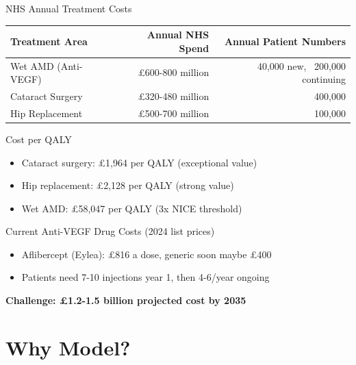 \documentclass[10pt,aspectratio=169]{beamer}
\begin{document}
\begin{frame}{NHS Annual Treatment Costs}
\begin{table}
\centering
\begin{tabular}{lrr}
\toprule
Treatment Area & Annual NHS Spend & Annual Patient Numbers \\
\midrule
\alert{Wet AMD (Anti-VEGF)} & \alert{£600-800 million} & 40,000 new, ~200,000 continuing \\
Cataract Surgery & £320-480 million & 400,000 \\
Hip Replacement & £500-700 million & 100,000 \\
\bottomrule
\end{tabular}
\end{table}

\vspace{0.3cm}
\begin{alertblock}{Cost per QALY}
\begin{itemize}
    \item Cataract surgery: £1,964 per QALY (exceptional value)
    \item Hip replacement: £2,128 per QALY (strong value)
    \item \alert{Wet AMD: £58,047 per QALY (3x NICE threshold)}
\end{itemize}
\end{alertblock}

\begin{block}{Current Anti-VEGF Drug Costs (2024 list prices)}
\begin{itemize}
    \item Aflibercept (Eylea): £816 a dose, generic soon maybe £400
    \item Patients need 7-10 injections year 1, then 4-6/year ongoing
\end{itemize}
\end{block}

\centering
\textbf{Challenge: £1.2-1.5 billion projected cost by 2035}
\end{frame}

\section{Why Model?}
\end{document}
